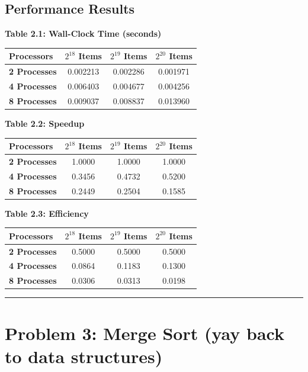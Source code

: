 \documentclass[11pt]{article}
\begin{document}
\subsection*{Performance Results}

\begin{center}
\textbf{Table 2.1: Wall-Clock Time (seconds)} \\
\begin{tabular}{@{}lccc@{}}
\toprule
Processors & $2^{18}$ Items & $2^{19}$ Items & $2^{20}$ Items \\
\midrule
\textbf{2 Processes} & 0.002213 & 0.002286 & 0.001971 \\
\textbf{4 Processes} & 0.006403 & 0.004677 & 0.004256 \\
\textbf{8 Processes} & 0.009037 & 0.008837 & 0.013960 \\
\bottomrule
\end{tabular}
\end{center}

\begin{center}
\textbf{Table 2.2: Speedup} \\
\begin{tabular}{@{}lccc@{}}
\toprule
Processors & $2^{18}$ Items & $2^{19}$ Items & $2^{20}$ Items \\
\midrule
\textbf{2 Processes} & 1.0000 & 1.0000 & 1.0000 \\
\textbf{4 Processes} & 0.3456 & 0.4732 & 0.5200 \\
\textbf{8 Processes} & 0.2449 & 0.2504 & 0.1585 \\
\bottomrule
\end{tabular}
\end{center}

\begin{center}
\textbf{Table 2.3: Efficiency} \\
\begin{tabular}{@{}lccc@{}}
\toprule
Processors & $2^{18}$ Items & $2^{19}$ Items & $2^{20}$ Items \\
\midrule
\textbf{2 Processes} & 0.5000 & 0.5000 & 0.5000 \\
\textbf{4 Processes} & 0.0864 & 0.1183 & 0.1300 \\
\textbf{8 Processes} & 0.0306 & 0.0313 & 0.0198 \\
\bottomrule
\end{tabular}
\end{center}

\noindent\rule{\textwidth}{0.4pt}

\section*{Problem 3: Merge Sort (yay back to data structures)}
\end{document}
